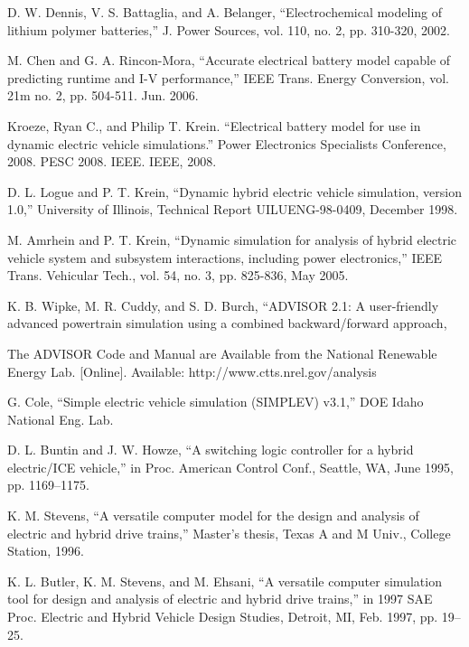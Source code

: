 D. W. Dennis, V. S. Battaglia, and A. Belanger, ``Electrochemical
modeling of lithium polymer batteries,” J. Power Sources, vol. 110,
no. 2, pp. 310-320, 2002.

M. Chen and G. A. Rincon-Mora, ``Accurate electrical battery model
capable of predicting runtime and I-V performance,” IEEE Trans.
Energy Conversion, vol. 21m no. 2, pp. 504-511. Jun. 2006.

Kroeze, Ryan C., and Philip T. Krein. ``Electrical battery model for use in dynamic electric vehicle simulations.'' Power Electronics Specialists Conference, 2008. PESC 2008. IEEE. IEEE, 2008.


D. L. Logue and P. T. Krein, ``Dynamic hybrid electric vehicle
simulation, version 1.0,” University of Illinois, Technical Report
UILUENG-98-0409, December 1998.

M. Amrhein and P. T. Krein, ``Dynamic simulation for analysis of
hybrid electric vehicle system and subsystem interactions, including
power electronics,” IEEE Trans. Vehicular Tech., vol. 54, no. 3, pp.
825-836, May 2005.

K. B. Wipke, M. R. Cuddy, and S. D. Burch, ``ADVISOR 2.1: A
user-friendly advanced powertrain simulation using a combined backward/forward
approach,

The ADVISOR Code and Manual are Available from the National Renewable
Energy Lab. [Online]. Available: http://www.ctts.nrel.gov/analysis

G. Cole, ``Simple electric vehicle simulation (SIMPLEV) v3.1,” DOE
Idaho National Eng. Lab.

D. L. Buntin and J. W. Howze, ``A switching logic controller for a
hybrid electric/ICE vehicle,” in Proc. American Control Conf., Seattle,
WA, June 1995, pp. 1169–1175.

K. M. Stevens, ``A versatile computer model for the design and analysis
of electric and hybrid drive trains,” Master’s thesis, Texas A and M Univ.,
College Station, 1996.

K. L. Butler, K. M. Stevens, and M. Ehsani, ``A versatile computer
simulation tool for design and analysis of electric and hybrid drive
trains,” in 1997 SAE Proc. Electric and Hybrid Vehicle Design Studies,
Detroit, MI, Feb. 1997, pp. 19–25.

